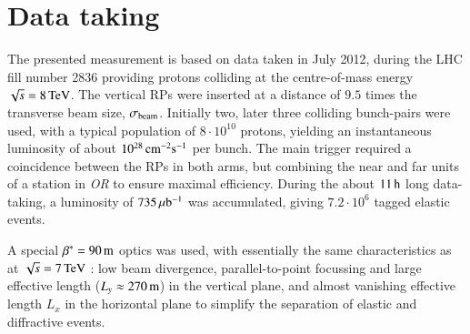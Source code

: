 \section{Data taking}

The presented measurement is based on data taken in July 2012, during the LHC fill number 2836 providing protons colliding at the centre-of-mass energy $\sqrt s = 8\,{\rm TeV}$. The vertical RPs were inserted at a distance of $9.5$ times the transverse beam size, $\sigma_{\rm beam}$. Initially two, later three colliding bunch-pairs were used, with a typical population of $8\cdot10^{10}$ protons, yielding an instantaneous luminosity of about $10^{28}\,{\rm cm^{-2}s^{-1}}$ per bunch. The main trigger required a coincidence between the RPs in both arms, but combining the near and far units of a station in \textit{OR} to ensure maximal efficiency. During the about $11\,{\rm h}$ long data-taking, a luminosity of $735\,{\rm \mu b^{-1}}$ was accumulated, giving $7.2\cdot 10^6$ tagged elastic events.

A special $\beta^* = 90\,{\rm m}$ optics was used, with essentially the same characteristics as at $\sqrt s = 7\,{\rm TeV}$ \cite{epl96}: low beam divergence, parallel-to-point focussing and large effective length ($L_y \approx 270\,{\rm m}$) in the vertical plane, and almost vanishing effective length $L_x$ in the horizontal plane to simplify the separation of elastic and diffractive events.

